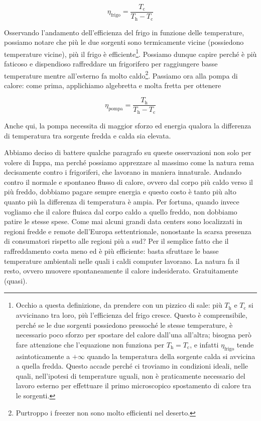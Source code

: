 \[ \eta_\text{frigo} = \frac{T_\text{c}}{T_\text{h} - T_\text{c}} \]

\noindent Osservando l'andamento dell'efficienza del frigo in funzione delle
temperature, possiamo notare che più le due sorgenti sono termicamente
vicine (possiedono temperature vicine), più il frigo è efficiente\footnote{Occhio a questa definizione, da prendere con un pizzico di
sale: più $T_\text{h}$ e $T_\text{c}$ si avvicinano tra loro, più
l'efficienza del frigo cresce. Questo è comprensibile, perché se le
due sorgenti possiedono pressoché le stesse temperature, è necessario
poco sforzo per spostare del calore dall'una all'altra; bisogna però
fare attenzione che l'equazione non funziona per $T_\text{h} = T_\text{c}$,
e infatti $\eta_\text{frigo}$ tende asintoticamente a $+\infty$ quando
la temperatura della sorgente calda si avvicina a quella fredda. Questo
accade perché ci troviamo in condizioni ideali, nelle quali, nell'ipotesi
di temperature uguali, non è praticamente necessario del lavoro esterno per effettuare
il primo microscopico spostamento di calore tra le sorgenti.}.
Possiamo dunque capire perché è più faticoso e dispendioso raffreddare
un frigorifero per raggiungere basse temperature mentre all'esterno
fa molto caldo\footnote{Purtroppo i freezer non sono molto efficienti
nel deserto.}.
Passiamo ora alla pompa di calore: come prima, applichiamo algebretta
e molta fretta per ottenere

\[ \eta_\text{pompa} = \frac{T_\text{h}}{T_\text{h} - T_\text{c}} \]

\noindent Anche qui, la pompa necessita di maggior sforzo ed energia
qualora la differenza di temperatura tra sorgente fredda e calda sia
elevata.

Abbiamo deciso di battere qualche paragrafo su queste osservazioni
non solo per volere di Iuppa, ma perché possiamo apprezzare al massimo
come la natura rema decisamente contro i frigoriferi, che lavorano
in maniera innaturale. Andando contro il normale e spontaneo flusso
di calore, ovvero dal corpo più caldo verso il più freddo, dobbiamo
pagare sempre energia e questo costo è tanto più alto quanto più
la differenza di temperatura è ampia. Per fortuna, quando invece
vogliamo che il calore fluisca dal corpo caldo a quello freddo,
non dobbiamo patire le stesse spese. Come mai alcuni grandi data
centers sono localizzati in regioni fredde e remote dell'Europa
settentrionale, nonostante la scarsa presenza di consumatori
rispetto alle regioni più a sud? Per il semplice fatto che il
raffreddamento costa meno ed è più efficiente: basta sfruttare
le basse temperature ambientali nelle quali i caldi computer
lavorano. La natura fa il resto, ovvero muovere spontaneamente
il calore indesiderato. Gratuitamente (quasi).

